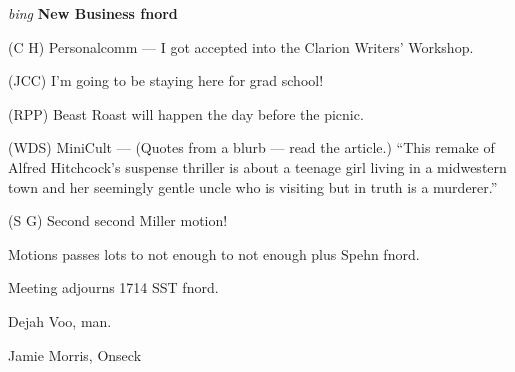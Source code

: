 \vspace{0.15in}
{\em bing\/} {\bf New Business fnord\/}

(C H) Personalcomm --- I got accepted into the Clarion Writers' Workshop.

(JCC) I'm going to be staying here for grad school!

(RPP) Beast Roast will happen the day before the picnic.

(WDS) MiniCult --- (Quotes from a blurb --- read the article.)  ``This remake
of Alfred Hitchcock's suspense thriller is about a teenage girl living in a
midwestern town and her seemingly gentle uncle who is visiting but in truth is
a murderer.''

(S G) Second second Miller motion!

Motions passes lots to not enough to not enough plus Spehn fnord.

Meeting adjourns 1714 SST fnord.

\vspace{0.15in}
\begin{center}
Dejah Voo, man.

Jamie Morris, Onseck
\end{center}

